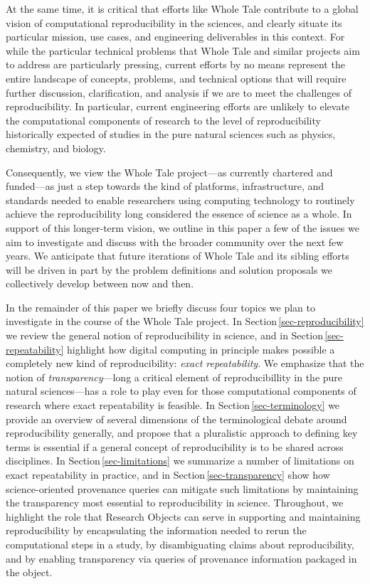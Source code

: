 At the same time, it is critical that efforts like Whole Tale contribute to a global 
	vision of computational reproducibility in the sciences, and clearly situate 
	its particular mission, use cases, and engineering deliverables in this context.
For while the particular technical problems that Whole Tale and similar projects
	aim to address are particularly pressing, current efforts by no means
	represent the entire landscape of concepts, problems, and technical options
	that will require further discussion, clarification, and analysis if we are to meet
	the challenges of reproducibility.
In particular, current engineering efforts are unlikely to elevate the computational components
	of research to the level of reproducibility historically expected of studies in the
	pure natural sciences such as physics, chemistry, and biology.

Consequently, we view the Whole Tale project---as currently chartered and funded---as just a step
	towards the kind of platforms, infrastructure, and standards
	needed to enable researchers using computing technology to routinely 
	achieve the reproducibility long considered the essence of science as a whole.
In support of this longer-term vision, we outline in this paper %
 a few of the issues	we aim to investigate and discuss with the broader community over the next few years.
We anticipate that future iterations of Whole Tale and its sibling efforts 
	will be driven in part by the problem definitions and solution proposals we collectively
	develop between now and then.

In the remainder of this paper 
we briefly discuss four topics we plan to investigate
	in the course of the Whole Tale project.
In Section\,\ref{sec-reproducibility} we review the general notion of
reproducibility in science, and in Section\,\ref{sec-repeatability} 
	highlight how digital computing in principle makes possible a completely new kind of reproducibility: 
	\emph{exact repeatability}. 
We emphasize that the notion of \emph{transparency}---long a critical element of
	reproducibillity in the pure natural sciences---has a role to play even for those computational components
	of research where exact repeatability is feasible.
In Section\,\ref{sec-terminology} we provide an overview of several dimensions of the terminological debate around reproducibility
	generally, and propose that a pluralistic approach to defining key terms is essential if a general 
	concept of reproducibility is to be shared across disciplines.
In Section\,\ref{sec-limitations} we summarize a number of limitations on exact repeatability in practice, and in Section\,\ref{sec-transparency}
	show how science-oriented provenance queries can mitigate such limitations by maintaining
 	the transparency most essential to reproducibility in science.
Throughout, we highlight the role that Research Objects \cite{bechhofer2013whya}
	can serve in supporting and maintaining reproducibility 
	by encapsulating the information needed to rerun the computational steps in a study, 
	by disambiguating claims about reproducibility, 
	and by enabling transparency via queries of provenance information packaged in the object. 



